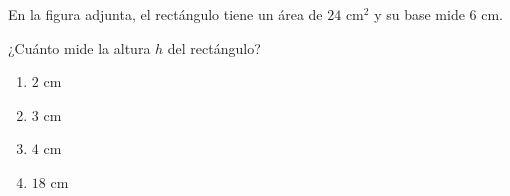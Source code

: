 
    \newpage
    \item En la figura adjunta, el rectángulo  tiene un área de $24$ cm$^{2}$ y su base mide $6$ cm.
        \begin{center}
        \end{center}

    ¿Cuánto mide la altura $h$ del rectángulo?
    \begin{enumerate}
        \item $2$ cm
        \item $3$ cm
        \item $4$ cm %
        \item $18$ cm
    \end{enumerate}
